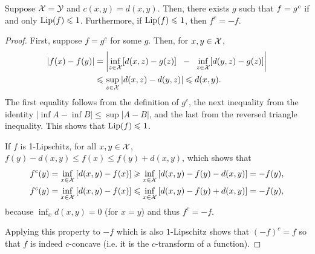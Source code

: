 \begin{prop}Suppose $\mathcal{X}=\mathcal{Y}$ and $c(x,y)=d(x,y)$. 
Then, there exists $g$ such that $f = g^c$ if and only $\operatorname{Lip}(f) \leqslant 1$. 
Furthermore, if $\operatorname{Lip}(f)\leqslant1$, then $f^c=-f$.
\end{prop}

\begin{proof}
First, suppose $f=g^c$ for some $g$.  Then, for $x,y\in \mathcal{X}$,
\begin{align*}
|f(x)-f(y)|&=\left|\inf_{z\in\mathcal{X}} [d(x,z)-g(z)] \;\; - \;\;\inf_{z\in \mathcal{X}} [d(y,z)-g(z)] \right|\\
&\leqslant \sup_{z\in\mathcal{X}} |d(x,z)-d(y,z)|\leqslant d(x,y).
\end{align*}
The first equality follows from the definition of $g^c$, the next inequality from the identity $|\inf A-\inf B|\leq\sup|A-B|$, and the last from the reversed triangle inequality. This shows that $\operatorname{Lip}(f)\leqslant1$.

If $f$ is 1-Lipschitz, for all $x,y\in\mathcal{X}$, $f(y)-d(x,y)\leq f(x)\leq f(y)+d(x,y)$, which shows that 
\begin{align*}
f^c(y)&=\inf_{x\in\mathcal{X}}\left[ d(x,y) - f(x) \right]
\geqslant\inf_{x\in \mathcal{X}} \left[  d(x,y)-f(y)-d(x,y)\right]=-f(y),\\
f^c(y)&=\inf_{x\in\mathcal{X}}\left[ d(x,y) - f(x) \right]
\leqslant \inf_{x\in\mathcal{X}}\left[ d(x,y) - f(y)+d(x,y) \right]=-f(y), 
\end{align*}
because $\inf_x d(x,y) = 0$ (for $x=y$) and thus $f^c=-f$. 

Applying this property to $-f$ which is also $1$-Lipschitz shows that $(-f)^c = f$ so that $f$ is indeed $c$-concave (i.e. it is the $c$-transform of a function). 
\end{proof}

